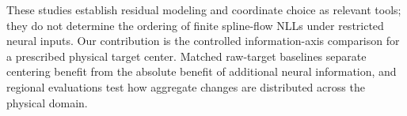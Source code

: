 These studies establish residual modeling and coordinate choice as relevant
tools; they do not determine the ordering of finite spline-flow NLLs under
restricted neural inputs. Our contribution is the controlled information-axis
comparison for a prescribed physical target center. Matched raw-target
baselines separate centering benefit from the absolute benefit of additional
neural information, and regional evaluations test how aggregate changes are
distributed across the physical domain.
